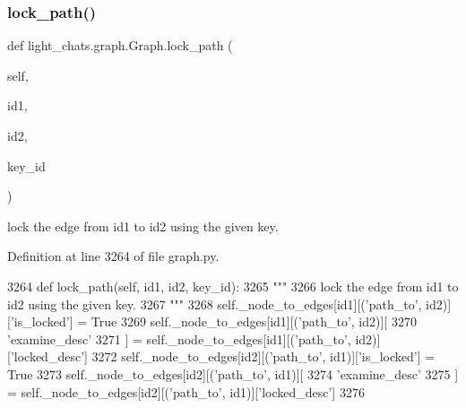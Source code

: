\subsubsection{\texorpdfstring{lock\+\_\+path()}{lock\_path()}}
{\footnotesize\ttfamily def light\+\_\+chats.\+graph.\+Graph.\+lock\+\_\+path (\begin{DoxyParamCaption}\item[{}]{self,  }\item[{}]{id1,  }\item[{}]{id2,  }\item[{}]{key\+\_\+id }\end{DoxyParamCaption})}

\begin{DoxyVerb}lock the edge from id1 to id2 using the given key.
\end{DoxyVerb}
 

Definition at line 3264 of file graph.\+py.


\begin{DoxyCode}
3264     \textcolor{keyword}{def }lock\_path(self, id1, id2, key\_id):
3265         \textcolor{stringliteral}{"""}
3266 \textcolor{stringliteral}{        lock the edge from id1 to id2 using the given key.}
3267 \textcolor{stringliteral}{        """}
3268         self.\_node\_to\_edges[id1][(\textcolor{stringliteral}{'path\_to'}, id2)][\textcolor{stringliteral}{'is\_locked'}] = \textcolor{keyword}{True}
3269         self.\_node\_to\_edges[id1][(\textcolor{stringliteral}{'path\_to'}, id2)][
3270             \textcolor{stringliteral}{'examine\_desc'}
3271         ] = self.\_node\_to\_edges[id1][(\textcolor{stringliteral}{'path\_to'}, id2)][\textcolor{stringliteral}{'locked\_desc'}]
3272         self.\_node\_to\_edges[id2][(\textcolor{stringliteral}{'path\_to'}, id1)][\textcolor{stringliteral}{'is\_locked'}] = \textcolor{keyword}{True}
3273         self.\_node\_to\_edges[id2][(\textcolor{stringliteral}{'path\_to'}, id1)][
3274             \textcolor{stringliteral}{'examine\_desc'}
3275         ] = self.\_node\_to\_edges[id2][(\textcolor{stringliteral}{'path\_to'}, id1)][\textcolor{stringliteral}{'locked\_desc'}]
3276 
\end{DoxyCode}
\mbox{\label{classlight__chats_1_1graph_1_1Graph_a8a92252320777766ddab522549671f43}} 
